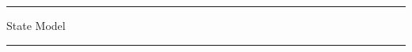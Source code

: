 \documentclass[a4paper]{article}
\begin{document}
  \thispagestyle{empty}
  \begin{center}
    {\rule{\textwidth}{0.2em}}
    {\Huge\yahei
    {State Model}}
    {\rule{\textwidth}{0.2em}}
  \end{center}
\end{document}
